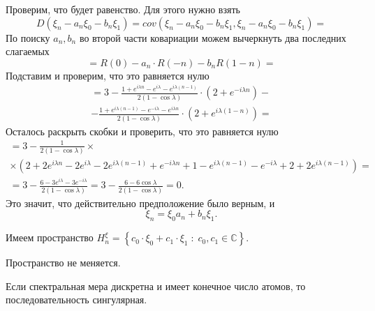 \begin{enumerate}[label=\alph*)]
  Проверим, что будет равенство.
  Для этого нужно взять
  \begin{equation*}
    D \left( \xi_n - a_n \xi_0 - b_n \xi_1 \right) =
    cov \left( \xi_n - a_n \xi_0 - b_n \xi_1, \xi_n - a_n \xi_0 - b_n \xi_1 \right) =
  \end{equation*}
  По поиску $a_n, b_n$ во второй части ковариации можем вычеркнуть два последних слагаемых
  \begin{equation*}
    = R \left( 0 \right) - a_n \cdot R \left( -n \right) - b_n R \left( 1 - n \right) =
  \end{equation*}
  Подставим и проверим, что это равняется нулю
  \begin{gather*}
    = 3 -
    \frac{1 + e^{i \lambda n} - e^{i \lambda } - e^{i \lambda \left( n - 1 \right) }}{2 \left( 1 - \cos \lambda \right) } \cdot
    \left( 2 + e^{-i \lambda n} \right) - \\
    - \frac{1 + e^{i \lambda \left( n - 1 \right) } - e^{-i \lambda } - e^{i \lambda n}}{2 \left( 1 - \cos \lambda \right) } \cdot
    \left( 2 + e^{i \lambda \left( 1 - n \right) } \right) =
  \end{gather*}
  Осталось раскрыть скобки и проверить, что это равняется нулю
  \begin{gather*}
    = 3 - \frac{1}{2 \left( 1 - \cos \lambda \right) } \times \\
    \times \left(
      2 + 2e^{i \lambda n} - 2e^{i \lambda } - 2e^{i \lambda \left( n - 1 \right) } +
      e^{-i \lambda n} + 1 - e^{i \lambda \left( n - 1 \right) } - e^{-i \lambda } + 2 +
      2e^{i \lambda \left( n - 1 \right) }
    \right) = \\
    = 3 - \frac{6 - 3e^{i \lambda } - 3e^{-i \lambda }}{2 \left( 1 - \cos \lambda \right) } =
    3 - \frac{6 - 6 \cos \lambda }{2 \left( 1 - \cos \lambda \right) } =
    0.
  \end{gather*}
  Это значит, что действительно предположение было верным, и
  \begin{equation*}
    \xi_n =
    \xi_0 a_n + b_n \xi_1.
  \end{equation*}

  Имеем пространство
  $H_n^{ \xi } =
  \left\{ c_0 \cdot \xi_0 + c_1 \cdot \xi_1 \; : \; c_0, c_1 \in \mathbb{C} \right\} $.

  Пространство не меняется.

  Если спектральная мера дискретна и имеет конечное число атомов, то последовательность сингулярная.
\end{enumerate}

